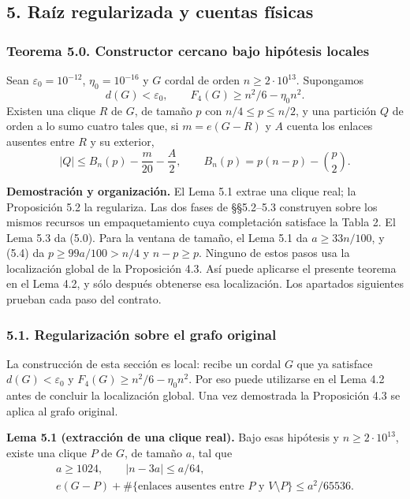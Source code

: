 \documentclass[spanish,11pt,a4paper]{article}
\begin{document}
\subsection{5. Raíz regularizada y cuentas físicas}\label{rauxedz-regularizada-y-cuentas-fuxedsicas}

\subsubsection{Teorema 5.0. Constructor cercano bajo hipótesis locales}\label{teorema-5.0.-constructor-cercano-bajo-hipuxf3tesis-locales}

Sean \(\varepsilon_0=10^{-12}\), \(\eta_0=10^{-16}\) y \(G\) cordal de orden \(n\ge2\cdot10^{13}\). Supongamos \[
d(G)<\varepsilon_0,\qquad F_4(G)\ge n^2/6-\eta_0n^2.
\] Existen una clique \(R\) de \(G\), de tamaño \(p\) con \(n/4\le p\le n/2\), y una partición \(Q\) de orden a lo sumo cuatro tales que, si \(m=e(G-R)\) y \(A\) cuenta los enlaces ausentes entre \(R\) y su exterior, \[
|Q|\le B_n(p)-\frac m{20}-\frac A2,\qquad
B_n(p)=p(n-p)-\binom p2.
\tag{5.0}
\]

\textbf{Demostración y organización.} El Lema 5.1 extrae una clique real; la Proposición 5.2 la regulariza. Las dos fases de §§5.2--5.3 construyen sobre los mismos recursos un empaquetamiento cuya completación satisface la Tabla 2. El Lema 5.3 da (5.0). Para la ventana de tamaño, el Lema 5.1 da \(a\ge33n/100\), y (5.4) da \(p\ge99a/100>n/4\) y \(n-p\ge p\). Ninguno de estos pasos usa la localización global de la Proposición 4.3. Así puede aplicarse el presente teorema en el Lema 4.2, y sólo después obtenerse esa localización. Los apartados siguientes prueban cada paso del contrato.

\subsubsection{5.1. Regularización sobre el grafo original}\label{regularizaciuxf3n-sobre-el-grafo-original}

La construcción de esta sección es local: recibe un cordal \(G\) que ya satisface \(d(G)<\varepsilon_0\) y \(F_4(G)\ge n^2/6-\eta_0n^2\). Por eso puede utilizarse en el Lema 4.2 antes de concluir la localización global. Una vez demostrada la Proposición 4.3 se aplica al grafo original.


\textbf{Lema 5.1 (extracción de una clique real).} Bajo esas hipótesis y \(n\ge2\cdot10^{13}\), existe una clique \(P\) de \(G\), de tamaño \(a\), tal que \[
\begin{gathered}
a\ge1024,\qquad |n-3a|\le a/64,\\
e(G-P)+\#\{\text{enlaces ausentes entre }P\text{ y }V\setminus P\}
\le a^2/65536.
\end{gathered}
\tag{5.1}
\]
\end{document}
